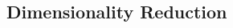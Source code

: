 \documentclass[twocolumn]{article}
\begin{document}
\begin{spacing}{1}


\section{Dimensionality Reduction}



\end{spacing}
\end{document}
